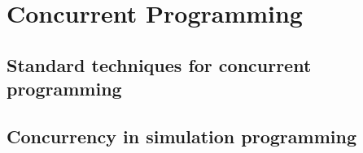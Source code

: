 \section{Concurrent Programming}

\subsection{Standard techniques for concurrent programming}

\subsection{Concurrency in simulation programming}